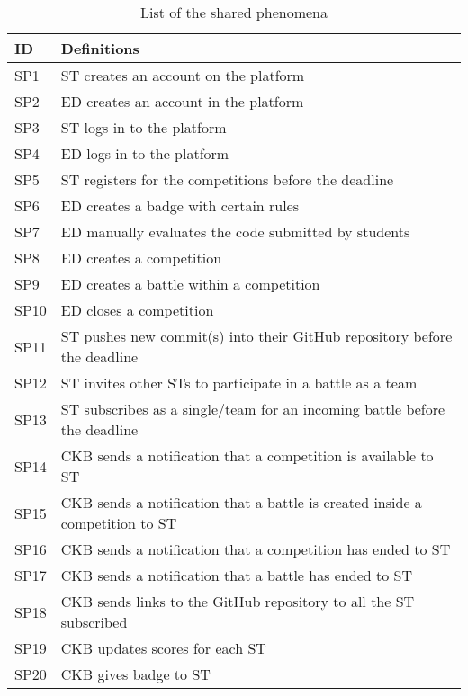 \begin{table}[H]
  \begin{tabular}{|l|l|}

    \hline
    \textbf{ID} & \textbf{Definitions}      \\
    \hline
    SP1 & ST creates an account on the platform \\
    \hline
    SP2 & ED creates an account in the platform \\
    \hline
    SP3 & ST logs in to the platform \\
    \hline
    SP4 & ED logs in to the platform  \\
    \hline
    SP5 & ST registers for the competitions before the deadline   \\
    \hline
    SP6 & ED creates a badge with certain rules   \\
    \hline
    SP7 & ED manually evaluates the code submitted by students   \\
    \hline
    SP8 & ED creates a competition   \\
    \hline
    SP9 & ED creates a battle within a competition   \\
    \hline
    SP10 & ED closes a competition   \\
    \hline
    SP11 & ST pushes new commit(s) into their GitHub repository before the deadline   \\
    \hline
    SP12 & ST invites other STs to participate in a battle as a team   \\
    \hline
    SP13 & ST subscribes as a single/team for an incoming battle before the deadline   \\
    \hline
    SP14 & CKB sends a notification that a competition is available to ST   \\
    \hline
    SP15 & CKB sends a notification that a battle is created inside a competition to ST   \\
    \hline
    SP16 & CKB sends a notification that a competition has ended to ST   \\
    \hline
    SP17 & CKB sends a notification that a battle has ended to ST   \\
    \hline
    SP18 & CKB sends links to the GitHub repository to all the ST subscribed   \\
    \hline
    SP19 & CKB updates scores for each ST   \\
    \hline
    SP20 & CKB gives badge to ST   \\
    \hline
    
  \end{tabular}
  \caption{List of the shared phenomena}
  \label{tab:sharedPhenomena}
\end{table}


